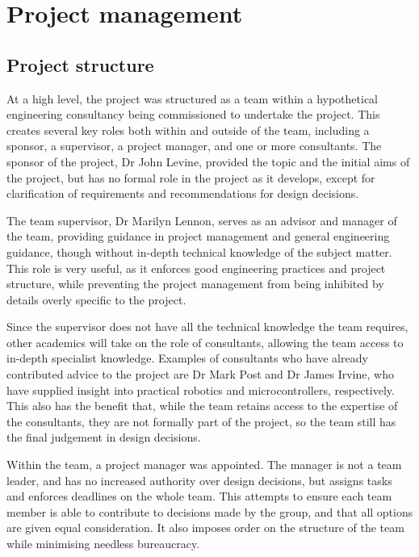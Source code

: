 
\section{Project management}\label{plan}
\thispagestyle{plain}

\subsection{Project structure}\label{plan/structure}

At a high level, the project was structured as a team within a hypothetical
engineering consultancy being commissioned to undertake the project. This creates
several key roles both within and outside of the team, including a sponsor, a
supervisor, a project manager, and one or more consultants. The sponsor of the
project, Dr John Levine, provided the topic and the initial aims of the
project, but has no formal role in the project as it develops, except for
clarification of requirements and recommendations for design decisions.

The team supervisor, Dr Marilyn Lennon, serves as an advisor and manager of
the team, providing guidance in project management and general engineering
guidance, though without in-depth technical knowledge of the subject matter.
This role is very useful, as it enforces good engineering practices and
project structure, while preventing the project management from being
inhibited by details overly specific to the project.

Since the supervisor does not have all the technical knowledge the team
requires, other academics will take on the role of consultants, allowing the
team access to in-depth specialist knowledge. Examples of consultants who have
already contributed advice to the project are Dr Mark Post and Dr James Irvine,
who have supplied insight into practical robotics and microcontrollers,
respectively. This also has the benefit that,
while the team retains access to the expertise of the consultants, they are not
formally part of the project, so the team still has the final judgement in
design decisions.

Within the team, a project manager was appointed. The manager is not a team
leader, and has no increased authority over design decisions, but assigns tasks
and enforces deadlines on the whole team. This
attempts to ensure each team member is able to contribute to decisions made by
the group, and that all options are given equal consideration. It also imposes
order on the structure of the team while minimising needless bureaucracy.

